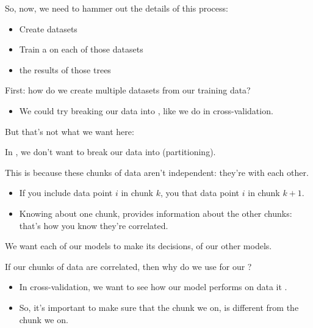         So, now, we need to hammer out the details of this process:

        \begin{itemize}
            \item Create  datasets 

            \item Train a  on each of those datasets

            \item {} the results of those trees
        \end{itemize}

        First: how do we create multiple datasets from our training data? 

        \begin{itemize}
            \item We could try breaking our data into , like we do in cross-validation.
        \end{itemize}

        But that's not what we want here:\\

        \begin{concept}
            In , we don't want to break our data into  (partitioning).

            This is because these chunks of data aren't independent: they're  with each other.

            \begin{itemize}
                \item If you include data point $i$ in chunk $k$, you  that data point $i$  in chunk $k+1$.

                \item Knowing about one chunk, provides information about the other chunks: that's how you know they're correlated.
            \end{itemize}

            We want each of our models to make its decisions,  of our other models.
        \end{concept}

        \phantom{}

        \begin{remark*}
            If our chunks of data are correlated, then why do we use  for our ?

            \begin{itemize}
                \item In cross-validation, we want to see how our model performs on data it .

                \item So, it's important to make sure that the chunk we  on, is different from the chunk we  on.
            \end{itemize}
        \end{remark*}


